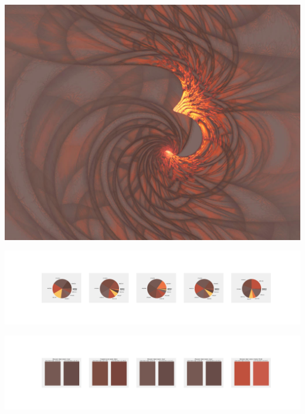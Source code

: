 \documentclass[11pt]{article}
\begin{document}
\begin{landscape}
    \begin{center}
    \includegraphics[width=\textwidth]{./nbimg/file (198).jpg}
    \end{center}

    \begin{center}
    \includegraphics[width=250mm]{./nbimg/pie-109.jpg}
    \end{center}

    \begin{center}
    \includegraphics[width=250mm]{./nbimg/peak-109.jpg}
    \end{center}
    


\end{landscape}
\end{document}

